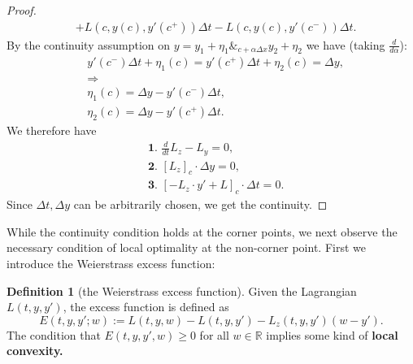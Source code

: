 \documentclass[a4paper,11pt,fleqn]{book}
\theoremstyle{definition}
\newtheorem{definition}{Definition}[section]
\theoremstyle{remark}
\begin{document}
\begin{proof}
\begin{align*}
	& + L(c, y(c), y'(c^+))\Delta t - L(c, y(c), y'(c^-)) \Delta t. 
\end{align*}
By the continuity assumption on $y = y_1 + \eta_1 \&_{c + \alpha \Delta x} y_2 + \eta_2$ we have (taking $\frac{d}{d\alpha}$):
\begin{equation}
\begin{aligned}
	& y'(c^-)\Delta t + \eta_1(c) = y'(c^+)\Delta t + \eta_2(c) = \Delta y,\\
	& \Rightarrow\\
	& \eta_1(c) = \Delta y - y'(c^-) \Delta t, \\
	& \eta_2(c) = \Delta y - y'(c^+) \Delta t. 
\end{aligned}
\end{equation}
We therefore have
\begin{equation}
\begin{aligned}
	& \textbf{1. } \frac{d}{dt} L_z - L_y = 0,\\
	& \textbf{2. } [L_z]_c \cdot \Delta y = 0,\\
	& \textbf{3. } [- L_z \cdot y'  +  L]_c \cdot \Delta t = 0.
\end{aligned}
\end{equation}
Since $\Delta t, \Delta y$ can be arbitrarily chosen, we get the continuity.
\end{proof}

While the continuity condition holds at the corner points, we next observe the necessary condition of local optimality at the non-corner point. First we introduce the Weierstrass excess function:
\begin{definition}[the Weierstrass excess function]
	Given the Lagrangian $L(t, y, y')$, the excess function is defined as 
	\begin{equation}
		E(t, y, y'; w):= L(t, y, w) - L(t, y, y') - L_z(t, y, y')(w - y'). 
	\end{equation}
	The condition that $E(t, y, y', w) \ge 0$ for all $w \in \mathbb{R}$ implies some kind of \textbf{local convexity.}
\end{definition}
\end{document}
